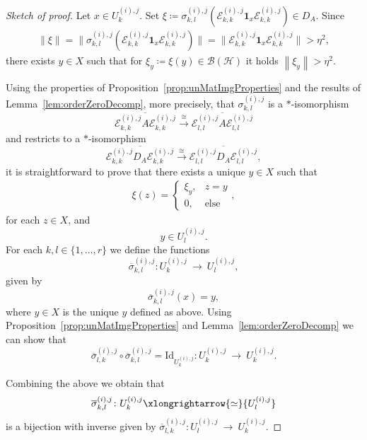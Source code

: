 \documentclass[a4paper]{amsart}
\numberwithin{equation}{section}
\newcommand{\Bcal}{\mathcal{B}}
\newcommand{\Ecal}{\mathcal{E}}
\newcommand{\Hcal}{\mathcal{H}}
\newcommand{\indF}{\mathbf{1}}
\newcommand{\bop}[1]{\Bcal({#1})}
\newcommand{\id}[1]{\mathrm{Id}_{#1}}
\newcommand{\rAr}{\longrightarrow}
\newcommand{\norm}[1]{{\left\lVert #1 \right \rVert}}
\newcommand{\normbig}[1]{{\big\lVert #1 \big \rVert}}
\newcommand{\unMatImg}[3]{{\Ecal_{#3}^{(#1), #2}}}
\theoremstyle{plain}
\theoremstyle{indented}
\numberwithin{equation}{section}
\theoremstyle{definition}
\theoremstyle{remark}
\theoremstyle{plain}
\theoremstyle{definition}
\begin{document}
\begin{proof}[Sketch of proof]
     Let ${x \in U^{(i),j}_k}$. Set ${\xi \coloneq \sigma_{k,l}^{(i),j}(\unMatImg{i}{j}{k,k} \indF_x \unMatImg{i}{j}{k,k}) \in D_A }$. 
    Since 
    \begin{align*}
        \normbig{\xi} = \normbig{ \sigma_{k,l}^{(i),j}(\unMatImg{i}{j}{k,k} \indF_x \unMatImg{i}{j}{k,k}) } =  \normbig{ \unMatImg{i}{j}{k,k} \indF_x \unMatImg{i}{j}{k,k}} >\eta^2 ,
    \end{align*}
    there exists ${y \in X}$ such that 
    for ${\xi_y \coloneq \xi(y) \in \bop{\Hcal}}$ it holds
     $ {\norm{\xi_y} > \eta^2}$.

     Using the properties of Proposition~\ref{prop:unMatImgProperties} 
     and the results of Lemma~\ref{lem:orderZeroDecomp}, more precisely, 
     that $\sigma_{k,l}^{(i),j}$ is a ${\ast}$-isomorphism
    \[{\overline{\unMatImg{i}{j}{k,k} A \unMatImg{i}{j}{k,k}} \overset{\cong}{\longrightarrow} \overline{\unMatImg{i}{j}{l,l} A \unMatImg{i}{j}{l,l}} }\]
    and restricts to a ${\ast}$-isomorphism
    \[\overline{\unMatImg{i}{j}{k,k} D_A \unMatImg{i}{j}{k,k}} \overset{\cong}{\longrightarrow} \overline{\unMatImg{i}{j}{l,l} D_A \unMatImg{i}{j}{l,l}},\]
    it is straightforward to prove that there exists a unique ${y \in X}$ such that
    \begin{align*}
            \xi(z) =\begin{cases}
                \xi_y , & z=y\\
                0, &  \text{else}
            \end{cases},
        \end{align*}
    for each $z \in X$,
    and 
    \[{y \in{U^{(i),j}_l}}.\]
    For each ${k,l\in\{1,\hdots,r\}}$ we define the functions
    \begin{equation}
       {\overline{\sigma}_{k,l}^{(i),j}} \colon{U^{(i),j}_k}~\rAr~U^{(i),j}_l,
    \end{equation}
    given by 
    \[{{\overline{\sigma}_{k,l}^{(i),j}}(x) = y},\]
    where ${y \in X}$ is the unique $y$ defined as above. 
    Using Proposition~\ref{prop:unMatImgProperties} 
    and Lemma~\ref{lem:orderZeroDecomp} we can show that
    \begin{equation*}
        {\overline{\sigma}_{l,k}^{(i),j}} \circ {\overline{\sigma}_{k,l}^{(i),j}} = \id{U^{(i),j}_k} \colon{U^{(i),j}_k}~\rAr~U^{(i),j}_k.
    \end{equation*}
    
    Combining the above we obtain that
    \begin{equation*}
        {\overline{\sigma}_{k,l}^{(i),j}} \colon{U^{(i),j}_k} \xlongrightarrow{\simeq}{U^{(i),j}_l}
    \end{equation*}
    is a bijection with inverse given by ${\overline{\sigma}_{l,k}^{(i),j}} \colon{U^{(i),j}_l}~\rAr~U^{(i),j}_k$. \qedhere
\end{proof}
\end{document}
